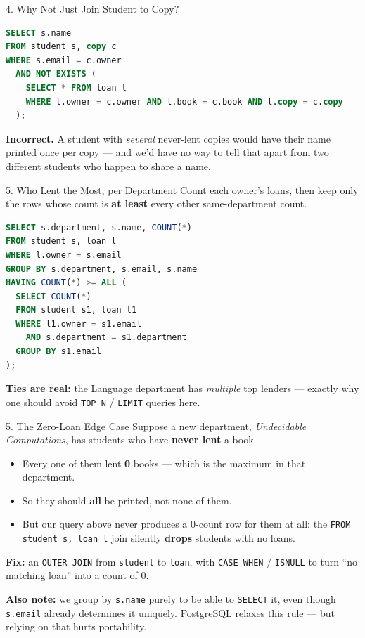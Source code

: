\documentclass{beamer}
\begin{document}
\begin{frame}[fragile]{4. Why Not Just Join Student to Copy?}
\small
\begin{lstlisting}[language=SQL]
SELECT s.name
FROM student s, copy c
WHERE s.email = c.owner
  AND NOT EXISTS (
    SELECT * FROM loan l
    WHERE l.owner = c.owner AND l.book = c.book AND l.copy = c.copy
  );
\end{lstlisting}
\textbf{Incorrect.} A student with \emph{several} never-lent copies would have their name printed once per copy --- and we'd have no way to tell that apart from two different students who happen to share a name.
\end{frame}

\begin{frame}[fragile]{5. Who Lent the Most, per Department}
\small
Count each owner's loans, then keep only the rows whose count is \textbf{at least} every other same-department count.
\begin{lstlisting}[language=SQL]
SELECT s.department, s.name, COUNT(*)
FROM student s, loan l
WHERE l.owner = s.email
GROUP BY s.department, s.email, s.name
HAVING COUNT(*) >= ALL (
  SELECT COUNT(*)
  FROM student s1, loan l1
  WHERE l1.owner = s1.email
    AND s.department = s1.department
  GROUP BY s1.email
);
\end{lstlisting}
\textbf{Ties are real:} the Language department has \emph{multiple} top lenders --- exactly why one should avoid \texttt{TOP N} / \texttt{LIMIT} queries here.
\end{frame}

\begin{frame}{5. The Zero-Loan Edge Case}
\small
Suppose a new department, \emph{Undecidable Computations}, has students who have \textbf{never lent} a book.
\begin{itemize}
  \item Every one of them lent \textbf{0} books --- which is the maximum in that department.
  \item So they should \textbf{all} be printed, not none of them.
  \item But our query above never produces a $0$-count row for them at all: the \texttt{FROM student s, loan l} join silently \textbf{drops} students with no loans.
\end{itemize}
\textbf{Fix:} an \texttt{OUTER JOIN} from \texttt{student} to \texttt{loan}, with \texttt{CASE WHEN} / \texttt{ISNULL} to turn ``no matching loan'' into a count of $0$.
\medskip

\textbf{Also note:} we group by \texttt{s.name} purely to be able to \texttt{SELECT} it, even though \texttt{s.email} already determines it uniquely. PostgreSQL relaxes this rule --- but relying on that hurts portability.
\end{frame}
\end{document}

